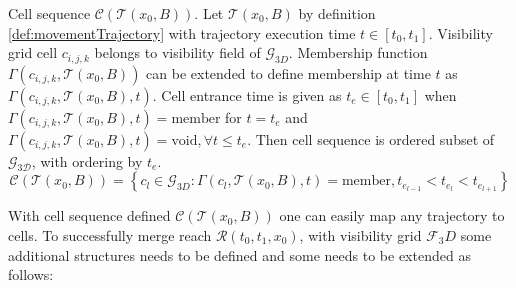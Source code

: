 \begin{definition}{Cell sequence $\mathscr{C}(\mathscr{T}(x_0,B))$.}\label{def:cellSequence}  
    Let $\mathscr{T}(x_0,B)$ by definition \ref{def:movementTrajectory} with trajectory execution time $t\in [t_0,t_1]$. Visibility grid cell $c_{i,j,k}$ belongs to visibility field of $\mathscr{G}_{3D}$. Membership function $\Gamma(c_{i,j,k},\mathscr{T}(x_0,B))$ can be extended to define membership at time $t$ as $\Gamma(c_{i,j,k},\mathscr{T}(x_0,B),t)$. Cell entrance time is given as $t_e\in [t_0,t_1]$ when $\Gamma(c_{i,j,k},\mathscr{T}(x_0,B),t) = \text{member}$ for $t=t_e$ and $\Gamma(c_{i,j,k},\mathscr{T}(x_0,B),t)=\text{void}, \forall t\le t_e$. Then cell sequence is ordered subset of $\mathscr{G_{3D}}$, with ordering by $t_e$.
    \begin{equation}
        \mathscr{C}(\mathscr{T}(x_0,B)) = \left\{c_l\in \mathscr{G}_{3D}:\Gamma(c_{l},\mathscr{T}(x_0,B),t) = \text{member}, t_{e_{l-1}} < t_{e_{l}} < t_{e_{l+1}} \right\}
    \end{equation}
\end{definition}
\noindent With cell sequence defined $\mathscr{C}(\mathscr{T}(x_0,B))$ one can easily map any trajectory to cells. To successfully merge reach $\mathscr{R}(t_0,t_1,x_0)$, with visibility grid $\mathscr{F}_3D$ some additional structures needs to be defined and some needs to be extended as follows:
